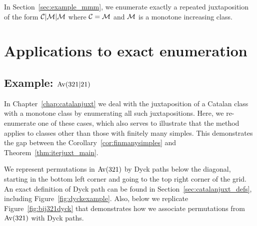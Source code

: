 \documentclass[12pt, a4paper, twoside]{report}
\begin{document}
In Section~\ref{sec:example_mmm}, we enumerate exactly a repeated juxtaposition of the form $\mathcal{C}|\mathcal{M}|\mathcal{M}$ where $\mathcal{C} = \mathcal{M}$ and $\mathcal{M}$ is a monotone increasing class. 

\section{Applications to exact enumeration}
\subsection{Example: $\mathrm{Av}(321|21)$}
\label{sec:example_Av321Av21}

In Chapter~\ref{chap:catalanjuxt} we deal with the juxtaposition of a Catalan class with a monotone class by enumerating all such juxtapositions. Here, we re-enumerate one of these cases, which also serves to illustrate that the method applies to classes other than those with finitely many simples. This demonstrates the gap between the Corollary~\ref{cor:finmanysimples} and Theorem~\ref{thm:iterjuxt_main}.

We represent permutations in $\mathrm{Av}(321)$ by Dyck paths below the diagonal, starting in the bottom left corner and going to the top right corner of the grid. An exact definition of Dyck path can be found in Section~\ref{sec:catalanjuxt_defs}, including Figure~\ref{fig:dyckexample}. Also, below we replicate Figure~\ref{fig:bij321dyck} that demonstrates how we associate permutations from $\mathrm{Av}(321)$ with Dyck paths.
\end{document}
